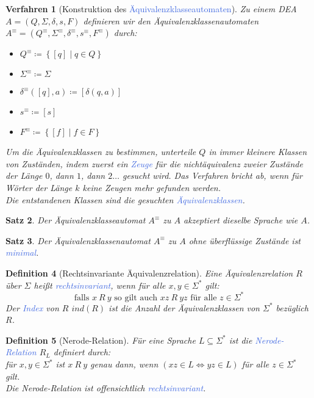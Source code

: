 \documentclass[11pt]{scrartcl}
\newcommand{\tcol}[1]{\textcolor{RoyalBlue}{#1}}
\newcommand{\set}[1]{\left\lbrace #1\right\rbrace}
\theoremstyle{break}
\newtheorem{satz}{Satz}[section]
\newtheorem{defi}[satz]{Definition}
\newtheorem{verf}[satz]{Verfahren}
\begin{document}
    \begin{verf}[Konstruktion des \tcol{Äquivalenzklasseautomaten}]
        Zu einem DEA $A=(Q,\Sigma,\delta ,s,F)$ definieren wir den Äquivalenzklassenautomaten $A^\equiv=(Q^\equiv ,\Sigma^\equiv ,\delta^\equiv ,s^\equiv ,F^\equiv)$ durch:
        \begin{itemize}
            \item $Q^\equiv\coloneqq\set{[q]\mid q\in Q}$
            \item $\Sigma^\equiv\coloneqq\Sigma$
            \item $\delta^\equiv([q],a)\coloneqq[\delta(q,a)]$
            \item $s^\equiv\coloneqq[s]$
            \item $F^\equiv\coloneqq\set{[f]\mid f\in F}$
        \end{itemize}
        Um die Äquivalenzklassen zu bestimmen, unterteile $Q$ in immer kleinere Klassen von Zuständen, indem zuerst ein \tcol{Zeuge} für die nichtäquivalenz zweier Zustände der Länge $0$, dann $1$, dann $2\dots$ gesucht wird.
        Das Verfahren bricht ab, wenn für Wörter der Länge $k$ keine Zeugen mehr gefunden werden.\\
        Die entstandenen Klassen sind die gesuchten \tcol{Äquivalenzklassen}.
    \end{verf}

    \begin{satz}
        Der Äquivalenzklasseautomat $A^\equiv$ zu $A$ akzeptiert dieselbe Sprache wie $A$.
    \end{satz}

    \begin{satz}
        Der Äquivalenzklassenautomat $A^\equiv$ zu $A$ ohne überflüssige Zustände ist \tcol{minimal}.
    \end{satz}

    \begin{defi}[Rechtsinvariante Äquivalenzrelation]
        Eine Äquivalenzrelation $R$ über $\Sigma$ heißt \tcol{rechtsinvariant}, wenn für alle $x,y\in\Sigma^*$ gilt:
        \[\text{falls } x\ R\ y\text{ so gilt auch }xz\ R\ yz\text{ für alle } z\in\Sigma^*\]
        Der \tcol{Index} von $R$ $ind(R)$ ist die Anzahl der Äquivalenzklassen von $\Sigma^*$ bezüglich $R$.
    \end{defi}

    \begin{defi}[Nerode-Relation]
        Für eine Sprache $L\subseteq\Sigma^*$ ist die \tcol{Nerode-Relation} $R_L$ definiert durch:\\
        für $x,y\in\Sigma^*$ ist $x\ R\ y$ genau dann, wenn $(xz\in L\Leftrightarrow yz\in L)$ für alle $z\in\Sigma^*$ gilt.\\
        Die Nerode-Relation ist offensichtlich \tcol{rechtsinvariant}.
    \end{defi}
\end{document}
